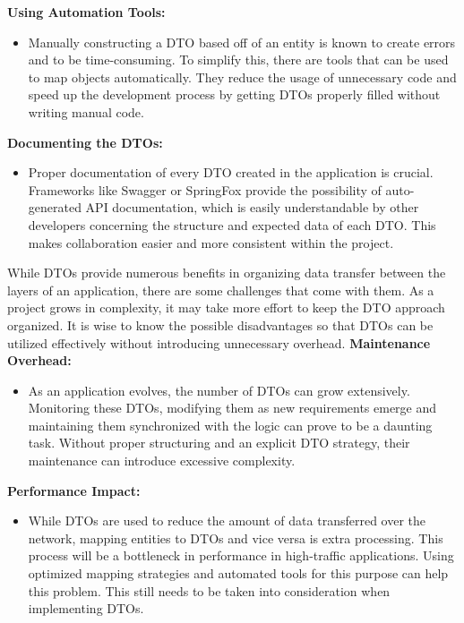     \textbf{Using Automation Tools:}
        \begin{itemize}
            \item Manually constructing a DTO based off of an entity is known to create errors and to be time-consuming. To simplify this, there are tools that can be used to map objects automatically. They reduce the usage of unnecessary code and speed up the development process by getting DTOs properly filled without writing manual code.
        \end{itemize}
    \textbf{Documenting the DTOs:}
        \begin{itemize}
            \item Proper documentation of every DTO created in the application is crucial. Frameworks like Swagger or SpringFox provide the possibility of auto-generated API documentation, which is easily understandable by other developers concerning the structure and expected data of each DTO. This makes collaboration easier and more consistent within the project. 
        \end{itemize} 
    While DTOs provide numerous benefits in organizing data transfer between the layers of an application, there are some challenges that come with them. As a project grows in complexity, it may take more effort to keep the DTO approach organized. It is wise to know the possible disadvantages so that DTOs can be utilized effectively without introducing unnecessary overhead. \newline \newline
    \textbf{Maintenance Overhead:}
    \begin{itemize}
        \item As an application evolves, the number of DTOs can grow extensively. Monitoring these DTOs, modifying them as new requirements emerge and maintaining them synchronized with the logic can prove to be a daunting task. Without proper structuring and an explicit DTO strategy, their maintenance can introduce excessive complexity.
    \end{itemize}
    \textbf{Performance Impact:}
    \begin{itemize}
        \item While DTOs are used to reduce the amount of data transferred over the network, mapping entities to DTOs and vice versa is extra processing. This process will be a bottleneck in performance in high-traffic applications. Using optimized mapping strategies and automated tools for this purpose can help this problem. This still needs to be taken into consideration when implementing DTOs.\newpage
    \end{itemize}
